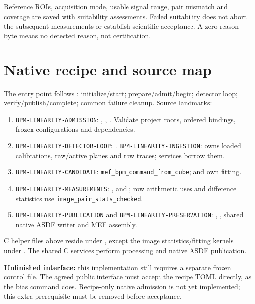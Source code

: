 \documentclass[10pt,a4paper]{article}
\begin{document}
Reference ROIs, acquisition mode, usable signal range, pair mismatch and
coverage are saved with suitability assessments. Failed suitability does not
abort the subsequent measurements or establish scientific acceptance.
A zero reason byte means no detected reason, not certification.

\hypertarget{native-recipe}{}
\section*{Native recipe and source map}
The entry point  follows
: initialize/start; prepare/admit/begin; detector loop;
verify/publish/complete; common failure cleanup. Source landmarks:
\begin{enumerate}
\item \texttt{BPM-LINEARITY-ADMISSION}: ,
, .
Validate project roots, ordered bindings, frozen configurations and dependencies.
\item \texttt{BPM-LINEARITY-DETECTOR-LOOP}: .
\texttt{BPM-LINEARITY-INGESTION}:  owns loaded
calibrations, raw/active planes and row traces; services borrow them.
\item \texttt{BPM-LINEARITY-CANDIDATE}: \texttt{mef\_bpm\_command\_from\_cube};
 and  own fitting.
\item \texttt{BPM-LINEARITY-MEASUREMENTS}:
, 
and ; row arithmetic uses
 and difference statistics use
\texttt{image\_pair\_stats\_checked}.
\item \texttt{BPM-LINEARITY-PUBLICATION} and
\texttt{BPM-LINEARITY-PRESERVATION}: ,
, shared native ASDF writer and MEF assembly.
\end{enumerate}
C helper files above reside under , except the
image statistics/fitting kernels under .
The shared C services perform processing and native ASDF publication.

\textbf{Unfinished interface:} this implementation still requires a separate
frozen control file. The agreed public interface must accept the recipe TOML
directly, as the bias command does. Recipe-only native admission is not yet
implemented; this extra prerequisite must be removed before acceptance.
\end{document}
